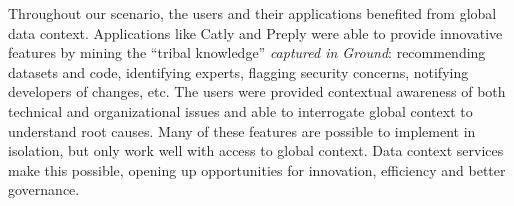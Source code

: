 \documentclass{sig-alternate}
\begin{document}
Throughout our scenario, the users and their applications benefited from global data context. 
Applications like Catly and Preply were able to provide innovative features by mining the ``tribal knowledge'' \emph{captured in Ground}:
recommending datasets and code, identifying experts, flagging security concerns, notifying developers of changes, etc.
The users were provided contextual awareness of both technical and organizational issues and able to interrogate global context to understand root causes. 
Many of these features are possible to implement in isolation, but only work well with access to global context. 
Data context services make this possible, opening up opportunities for innovation, efficiency and better governance.




    
    
    
\end{document}
